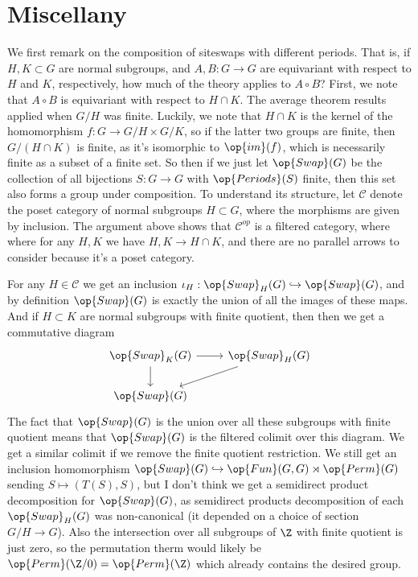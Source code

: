 \documentclass[12nt]{article}
\theoremstyle{plain}
\begin{document}
\section{Miscellany}

We first remark on the composition of siteswaps with different periods. That is, if $H, K \subset G$ are normal subgroups, and $A, B : G \to G$ are equivariant with respect to $H$ and $K$, respectively, how much of the theory applies to $A \circ B$? First, we note that $A \circ B$ is equivariant with respect to $H \cap K$. The average theorem results applied when $G/H$ was finite. Luckily, we note that $H \cap K$ is the kernel of the homomorphism $f : G \to G/H \times G/K$, so if the latter two groups are finite, then $G/(H \cap K)$ is finite, as it's isomorphic to $\op{im}(f)$, which is necessarily finite as a subset of a finite set. So then if we just let $\op{Swap}(G)$ be the collection of all bijections $S : G \to G$ with $\op{Periods}(S)$ finite, then this set also forms a group under composition. To understand its structure, let $\mathcal{C}$ denote the poset category of normal subgroups $H \subset G$, where the morphisms are given by inclusion. The argument above shows that $\mathcal{C}^{op}$ is a filtered category, where where for any $H, K$ we have $H, K \to H \cap K$, and there are no parallel arrows to consider because it's a poset category. 

For any $H \in \mathcal{C}$ we get an inclusion $\iota_H : \op{Swap}_H(G) \hookrightarrow \op{Swap}(G)$, and by definition $\op{Swap}(G)$ is exactly the union of all the images of these maps. And if $H \subset K$ are normal subgroups with finite quotient, then then we get a commutative diagram
\[
\begin{tikzcd}
\op{Swap}_K(G) \ar[r] \ar[d] & \op{Swap}_H(G) \ar[dl] \\
\op{Swap}(G)
\end{tikzcd}
\]
The fact that $\op{Swap}(G)$ is the union over all these subgroups with finite quotient means that $\op{Swap}(G)$ is the filtered colimit over this diagram. We get a similar colimit if we remove the finite quotient restriction. We still get an inclusion homomorphism $\op{Swap}(G) \hookrightarrow \op{Fun}(G, G) \rtimes \op{Perm}(G)$ sending $S \mapsto (T(S), S)$, but I don't think we get a semidirect product decomposition for $\op{Swap}(G)$, as semidirect products decomposition of each $\op{Swap}_H(G)$ was non-canonical (it depended on a choice of section $G/H \to G$). Also the intersection over all subgroups of $\Z$ with finite quotient is just zero, so the permutation therm would likely be $\op{Perm}(\Z/0) = \op{Perm}(\Z)$ which already contains the desired group. 
\end{document}
